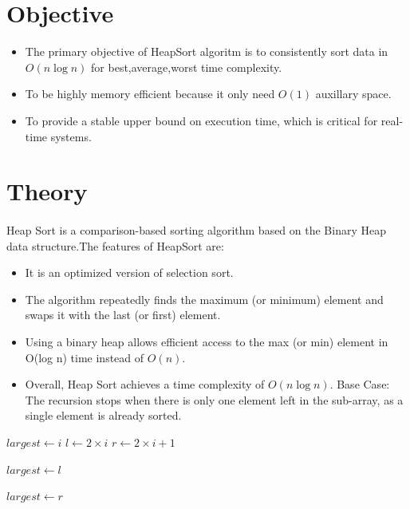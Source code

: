 \documentclass{article}
\begin{document}
{\normalsize
\section*{Objective}
\begin{itemize}
    \item The primary objective of HeapSort algoritm is to consistently sort data in $O(n \log n)$ for best,average,worst time complexity.
    \item To be highly memory efficient because it only need $O(1)$ auxillary space.
    \item To provide a stable upper bound on execution time, which is critical for real-time systems.
\end{itemize}

\section*{Theory}
\paragraph{} 
Heap Sort is a comparison-based sorting algorithm based on the Binary Heap data structure.The features of HeapSort are:
\vspace{0.1mm}
\begin{itemize}
    \item It is an optimized version of selection sort.
    \item The algorithm repeatedly finds the maximum (or minimum) element and swaps it with the last (or first) element.
    \item Using a binary heap allows efficient access to the max (or min) element in O(log n) time instead of $O(n)$.
    \item Overall, Heap Sort achieves a time complexity of $O(n \log n)$.
Base Case: The recursion stops when there is only one element left in the sub-array, as a single element is already sorted.
\end{itemize}
\pagebreak
\begin{algorithm}
\caption{Heap Sort}
\begin{algorithmic}[1]

    \State $largest \gets i$
    \State $l \gets 2 \times i$
    \State $r \gets 2 \times i + 1$

        \State $largest \gets l$
    \EndIf

        \State $largest \gets r$
    \EndIf


\end{algorithmic}
\end{algorithm}}
\end{document}
